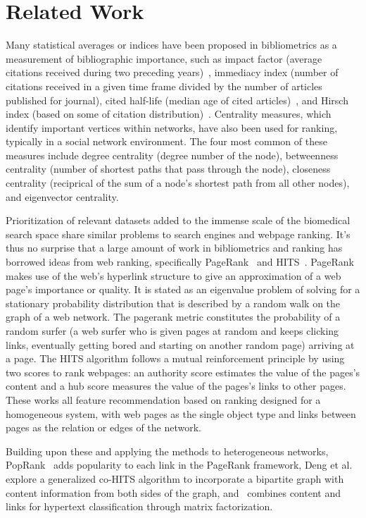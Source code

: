 \section{Related Work}
\label{sec:related}
Many statistical averages or indices have been proposed in bibliometrics as a measurement of bibliographic importance, such as impact factor (average citations received during two preceding years)~\cite{garfield1972citation}, immediacy index (number of citations received in a given time frame divided by the number of articles published for journal), cited half-life (median age of cited articles)~\cite{elsevier}, and Hirsch index (based on some of citation distribution)~\cite{hirsch2005index}. Centrality measures, which identify important vertices within networks, have also been used for ranking, typically in a social network environment. The four most common of these measures include degree centrality (degree number of the node), betweenness centrality (number of shortest paths that pass through the node), closeness centrality (reciprical of the sum of a node's shortest path from all other nodes), and eigenvector centrality.

Prioritization of relevant datasets added to the immense scale of the biomedical search space share similar problems to search engines and webpage ranking. It's thus no surprise that a large amount of work in bibliometrics and ranking has borrowed ideas from web ranking, specifically PageRank~\cite{pagerank} and HITS~\cite{hits}. PageRank makes use of the web's hyperlink structure to give an approximation of a web page's importance or quality. It is stated as an eigenvalue problem of solving for a stationary probability distribution that is described by a random walk on the graph of a web network. The pagerank metric constitutes the probability of a random surfer (a web surfer who is given pages at random and keeps clicking links, eventually getting bored and starting on another random page) arriving at a page. The HITS algorithm follows a mutual reinforcement principle by using two scores to rank webpages: an authority score estimates the value of the pages's content and a hub score measures the value of the pages's links to other pages. These works all feature recommendation based on ranking designed for a homogeneous system, with web pages as the single object type and links between pages as the relation or edges of the network. 

Building upon these and applying the methods to heterogeneous networks, PopRank~\cite{nie2005object} adds popularity to each link in the PageRank framework, Deng et al.~\cite{deng2009generalized} explore a generalized co-HITS algorithm to incorporate a bipartite graph with content information from both sides of the graph, and~\cite{zhu2007combining} combines content and links for hypertext classification through matrix factorization.

